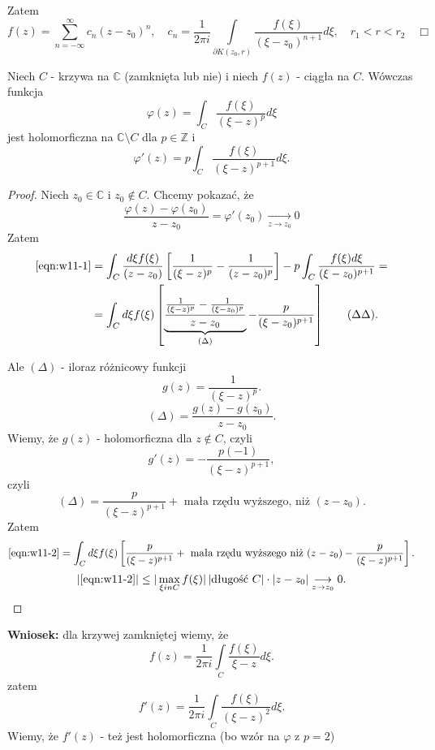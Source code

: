 \documentclass[../main.tex]{subfiles}
\begin{document}
 Zatem
 \[
     f(z) = \sum_{n=-\infty}^{\infty} c_n (z-z_0)^n, \quad c_n = \frac{1}{2\pi i} \int\limits_{\partial K(z_0,r)} \frac{f(\xi)}{(\xi - z_0)^{n+1}}d\xi, \quad r_1<r<r_2 \quad\Box
 \]

 \begin{tw}
     Niech $C$ - krzywa na $\mathbb{C}$ (zamknięta lub nie) i niech $f(z)$ - ciągła na $C$. Wówczas funkcja
     \[
         \varphi(z) = \int_C \frac{f(\xi)}{(\xi - z)^p}d\xi
     \]
     jest holomorficzna na $\mathbb{C}\setminus C$ dla $p\in \mathbb{Z}$ i
     \[
         \varphi'(z) = p\int_C \frac{f(\xi)}{(\xi - z)^{p+1}}d\xi
     .\]
 \end{tw}
 \begin{proof}
     Niech $z_0\in\mathbb{C}$ i $z_0\not\in C$. Chcemy pokazać, że
     \begin{equation}
         \label{eqn:w11-1}
         \frac{\varphi(z) - \varphi(z_0)}{z-z_0} = \varphi'(z_0) \underset{z \to z_0}{\longrightarrow} 0 \tag{*}
     \end{equation}
 Zatem
 \begin{align}
     \label{eqn:w11-2}
     \eqref{eqn:w11-1} &= \int_C \frac{d\xi f(\xi)}{(z-z_0)}\left[ \frac{1}{(\xi - z)^p} - \frac{1}{(z-z_0)^p} \right] - p\int_C \frac{f(\xi) d\xi}{(\xi - z_0)^{p+1}} = \\
     &= \int_C d\xi f(\xi) \left[ \underbrace{\frac{\frac{1}{(\xi - z)^p} - \frac{1}{(\xi - z_0)^p}}{z-z_0}}_{(\Delta)} - \frac{p}{(\xi - z_0)^{p+1}} \right] \tag{$\Delta\Delta$}
 .\end{align}

 Ale $(\Delta)$ - iloraz różnicowy funkcji \[
     g(z) = \frac{1}{(\xi - z)^p}
 .\]
 \[
     (\Delta) = \frac{g(z) - g(z_0)}{z-z_0}
 .\]
 Wiemy, że $g(z)$ - holomorficzna dla $z\not\in C$, czyli
      \[
          g'(z) = -\frac{p(-1)}{(\xi - z)^{p+1}}
     ,\]
 czyli
     \[
         (\Delta) = \frac{p}{(\xi - z)^{p+1}} + \text{ mała rzędu wyższego, niż }(z-z_0)
     .\]
 Zatem
     \[
         \eqref{eqn:w11-2} = \int_C d\xi f(\xi) \left[ \frac{p}{(\xi - z)^{p+1}} + \text{ mała rzędu wyższego niż }(z-z_0) - \frac{p}{(\xi - z)^{p+1}} \right]
     .\]
 \[
     |\eqref{eqn:w11-2}| \le |\max\limits_{\xi in C} f(\xi)|\left| \text{długość }C\right|\cdot  |z-z_0| \underset{z\to z_0}{\longrightarrow} 0
 .\]
 \end{proof}
 \textbf{Wniosek:} dla krzywej zamkniętej wiemy, że
 \[
     f(z) = \frac{1}{2\pi i}\int\limits_C \frac{f(\xi)}{\xi - z}d\xi
 .\]
 zatem
 \[
     f'(z) = \frac{1}{2\pi i}\int\limits_C \frac{f(\xi)}{(\xi - z)^2}d\xi
 .\]
 Wiemy, że $f'(z)$ - też jest holomorficzna (bo wzór na $\varphi$ z $p = 2$)
\end{document}
